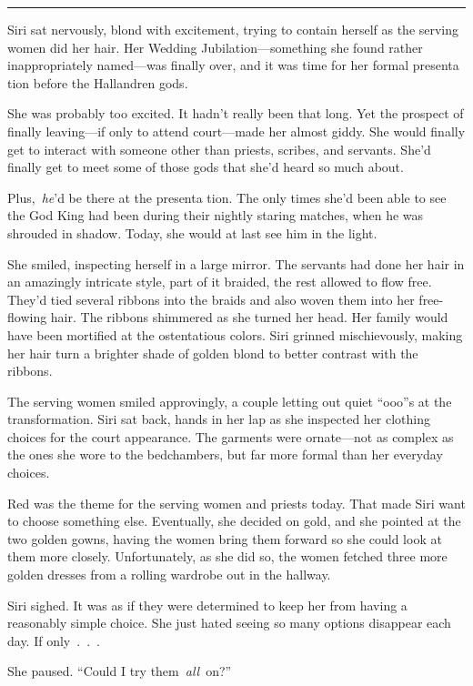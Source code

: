 \bigskip \hrule \bigskip

Siri sat nervously, blond with excitement, trying to contain herself as the serving women did her hair. Her Wedding Jubilation—something she found rather inappropriately named—was finally over, and it was time for her formal presenta tion before the Hallandren gods.

She was probably too excited. It hadn’t really been that long. Yet the prospect of finally leaving—if only to attend court—made her almost giddy. She would finally get to interact with someone other than priests, scribes, and servants. She’d finally get to meet some of those gods that she’d heard so much about.

Plus,~\textit{he}’d be there at the presenta tion. The only times she’d been able to see the God King had been during their nightly staring matches, when he was shrouded in shadow. Today, she would at last see him in the light.

She smiled, inspecting herself in a large mirror. The servants had done her hair in an amazingly intricate style, part of it braided, the rest allowed to flow free. They’d tied several ribbons into the braids and also woven them into her free-flowing hair. The ribbons shimmered as she turned her head. Her family would have been mortified at the ostentatious colors. Siri grinned mischievously, making her hair turn a brighter shade of golden blond to better contrast with the ribbons.

The serving women smiled approvingly, a couple letting out quiet “ooo”s at the transformation. Siri sat back, hands in her lap as she inspected her clothing choices for the court appearance. The garments were ornate—not as complex as the ones she wore to the bedchambers, but far more formal than her everyday choices.

Red was the theme for the serving women and priests today. That made Siri want to choose something else. Eventually, she decided on gold, and she pointed at the two golden gowns, having the women bring them forward so she could look at them more closely. Unfortunately, as she did so, the women fetched three more golden dresses from a rolling wardrobe out in the hallway.

Siri sighed. It was as if they were determined to keep her from having a reasonably simple choice. She just hated seeing so many options disappear each day. If only~.~.~.

She paused. “Could I try them~\textit{all}~on?”

